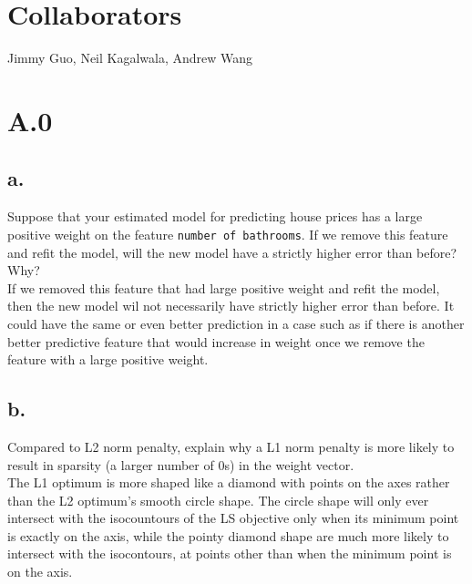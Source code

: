 \documentclass{article}
\date{{}}
\newcommand{\1}{\mathbf{1}}
\begin{document}
\thispagestyle{firstpageheader}

\section*{Collaborators}
{\Large 
Jimmy Guo, Neil Kagalwala, Andrew Wang
}

\section*{A.0}
{\Large 

\subsection*{a.}

Suppose that your estimated model for predicting house prices has a large positive weight on the feature \texttt{number of bathrooms}. If we remove this feature and refit the model, will the new model have a strictly higher error than before? Why? \\

If we removed this feature that had large positive weight and refit the model, then the new model wil not necessarily have strictly higher error than before. It could have the same or even better prediction in a case such as if there is another better predictive feature that would increase in weight once we remove the feature with a large positive weight.

\subsection*{b.}

Compared to L2 norm penalty, explain why a L1 norm penalty is more likely to result in sparsity (a larger number of 0s) in the weight vector. \\

The L1 optimum is more shaped like a diamond with points on the axes rather than the L2 optimum's smooth circle shape. The circle shape will only ever intersect with the isocountours of the LS objective only when its minimum point is exactly on the axis, while the pointy diamond shape are much more likely to intersect with the isocontours, at points other than when the minimum point is on the axis.

}
\end{document}
